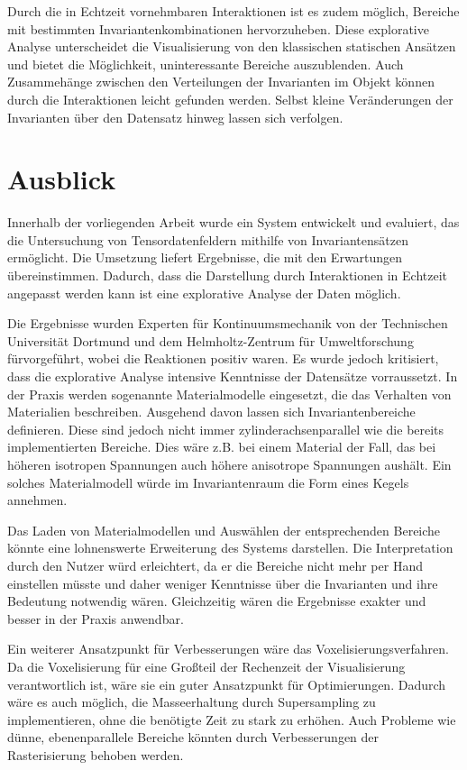 \documentclass[a4paper,fontsize=12pt,toc=bib,halfparskip,ngerman]{scrartcl}
\begin{document}
Durch die in Echtzeit vornehmbaren Interaktionen ist es zudem m\"oglich, Bereiche mit bestimmten Invariantenkombinationen hervorzuheben. Diese explorative Analyse unterscheidet die Visualisierung von den klassischen statischen Ans\"atzen und bietet die M\"oglichkeit, uninteressante Bereiche auszublenden. Auch Zusammeh\"ange zwischen den Verteilungen der Invarianten im Objekt k\"onnen durch die Interaktionen leicht gefunden werden. Selbst kleine Ver\"anderungen der Invarianten \"uber den Datensatz hinweg lassen sich verfolgen.

\section{Ausblick}
\label{sec:Ausblick}
Innerhalb der vorliegenden Arbeit wurde ein System entwickelt und evaluiert, das die Untersuchung von Tensordatenfeldern mithilfe von Invariantens\"atzen erm\"oglicht. Die Umsetzung liefert Ergebnisse, die mit den Erwartungen \"ubereinstimmen. Dadurch, dass die Darstellung durch Interaktionen in Echtzeit angepasst werden kann ist eine explorative Analyse der Daten m\"oglich. 

Die Ergebnisse wurden Experten f\"ur Kontinuumsmechanik von der Technischen Universit\"at Dortmund und dem Helmholtz-Zentrum f\"ur Umweltforschung f\"urvorgef\"uhrt, wobei die Reaktionen positiv waren. Es wurde jedoch kritisiert, dass die explorative Analyse intensive Kenntnisse der Datens\"atze vorraussetzt. In der Praxis werden sogenannte Materialmodelle eingesetzt, die das Verhalten von Materialien beschreiben. Ausgehend davon lassen sich Invariantenbereiche definieren. Diese sind jedoch nicht immer zylinderachsenparallel wie die bereits implementierten Bereiche. Dies w\"are z.B. bei einem Material der Fall, das bei h\"oheren isotropen Spannungen auch h\"ohere anisotrope Spannungen aush\"alt. Ein solches Materialmodell w\"urde im Invariantenraum die Form eines Kegels annehmen. 

Das Laden von Materialmodellen und Ausw\"ahlen der entsprechenden Bereiche k\"onnte eine lohnenswerte Erweiterung des Systems darstellen. Die Interpretation durch den Nutzer w\"urd erleichtert, da er die Bereiche nicht mehr per Hand einstellen m\"usste und daher weniger Kenntnisse \"uber die Invarianten und ihre Bedeutung notwendig w\"aren. Gleichzeitig w\"aren die Ergebnisse exakter und besser in der Praxis anwendbar. 

Ein weiterer Ansatzpunkt f\"ur Verbesserungen w\"are das Voxelisierungsverfahren. Da die Voxelisierung f\"ur eine Gro{\ss}teil der Rechenzeit der Visualisierung verantwortlich ist, w\"are sie ein guter Ansatzpunkt f\"ur Optimierungen. Dadurch w\"are es auch m\"oglich, die Masseerhaltung durch Supersampling zu implementieren, ohne die ben\"otigte Zeit zu stark zu erh\"ohen. Auch Probleme wie d\"unne, ebenenparallele Bereiche k\"onnten durch Verbesserungen der Rasterisierung behoben werden.
\end{document}
